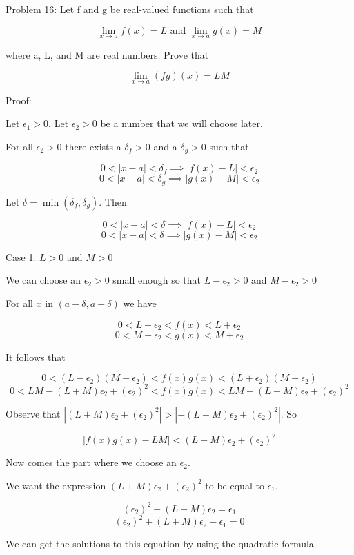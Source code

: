   Problem 16: Let f and g be real-valued functions such that

    $$ \lim_{x \rightarrow a} f(x) = L \text{ and } \lim_{x \rightarrow a} g(x) = M $$

where a, L, and M are real numbers. Prove that

    $$ \lim_{x \rightarrow a} (fg)(x) = LM $$

Proof:

Let $\epsilon_1 > 0$. Let $\epsilon_2 > 0$ be a number that we will choose later.

For all $\epsilon_2 > 0$ there exists a $\delta_f > 0$ and a $\delta_g > 0$ such that

    $$ 0 < |x - a| < \delta_f \implies |f(x) - L| < \epsilon_2 $$
    $$ 0 < |x - a| < \delta_g \implies |g(x) - M| < \epsilon_2 $$

Let $\delta = \min(\delta_f, \delta_g)$. Then

    $$ 0 < |x - a| < \delta \implies |f(x) - L| < \epsilon_2 $$
    $$ 0 < |x - a| < \delta \implies |g(x) - M| < \epsilon_2 $$

Case 1: $L > 0$ and $M > 0$

We can choose an $\epsilon_2 > 0$ small enough so that $L - \epsilon_2 > 0$ and $M - \epsilon_2 > 0$

For all $x$ in $(a - \delta, a + \delta)$ we have

    $$ 0 < L - \epsilon_2 < f(x) < L + \epsilon_2 $$
    $$ 0 < M - \epsilon_2 < g(x) < M + \epsilon_2 $$

It follows that

    $$ 0 < (L - \epsilon_2)(M - \epsilon_2) < f(x)g(x) < (L + \epsilon_2)(M + \epsilon_2) $$
    $$ 0 < LM - (L + M)\epsilon_2 + (\epsilon_2)^2 < f(x)g(x) < LM + (L + M)\epsilon_2 + (\epsilon_2)^2 $$

Observe that $|(L + M)\epsilon_2 + (\epsilon_2)^2| > |-(L + M)\epsilon_2 + (\epsilon_2)^2|$. So

    $$ |f(x)g(x) - LM| < (L + M)\epsilon_2 + (\epsilon_2)^2 $$

Now comes the part where we choose an $\epsilon_2$.

We want the expression $(L + M)\epsilon_2 + (\epsilon_2)^2$ to be equal to $\epsilon_1$.

    $$ (\epsilon_2)^2 + (L + M)\epsilon_2 = \epsilon_1 $$
    $$ (\epsilon_2)^2 + (L + M)\epsilon_2 - \epsilon_1 = 0 $$

We can get the solutions to this equation by using the quadratic formula.

